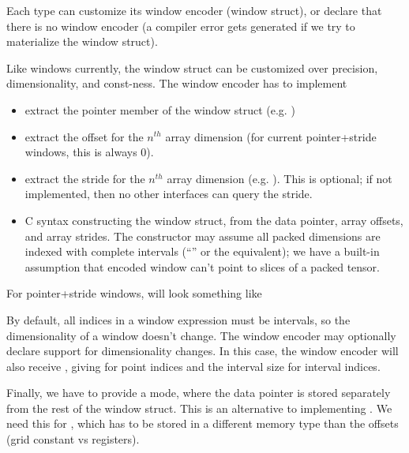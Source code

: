 Each  type can customize its window encoder (window struct), or declare that there is no window encoder (a compiler error gets generated if we try to materialize the window struct).

\filbreak
Like windows currently, the window struct can be customized over precision, dimensionality, and const-ness.
The window encoder has to implement
\begin{itemize}
  \item {} extract the pointer member of the window struct (e.g. )
  \filbreak
  \item {} extract the offset for the $n^{th}$ array dimension (for current pointer+stride windows, this is always 0).
  \filbreak
  \item {} extract the stride for the $n^{th}$ array dimension (e.g. ). This is optional; if not implemented, then no other interfaces can query the stride.
  \filbreak
  \item {} C syntax constructing the window struct, from the data pointer, array offsets, and array strides.
  The constructor may assume all packed dimensions are indexed with complete intervals (``\lighttt{:}'' or the equivalent); we have a built-in assumption that encoded window can't point to slices of a packed tensor.
\end{itemize}

\filbreak
For pointer+stride windows,  will look something like



\filbreak
By default, all indices in a window expression must be intervals, so the dimensionality of a window doesn't change.
The window encoder may optionally declare support for dimensionality changes.
In this case, the window encoder will also receive , giving  for point indices and the interval size for interval indices.

\filbreak
Finally, we have to provide a  mode, where the data pointer is stored separately from the rest of the window struct.
This is an alternative to implementing .
We need this for , which has to be stored in a different memory type than the offsets (grid constant vs registers).

